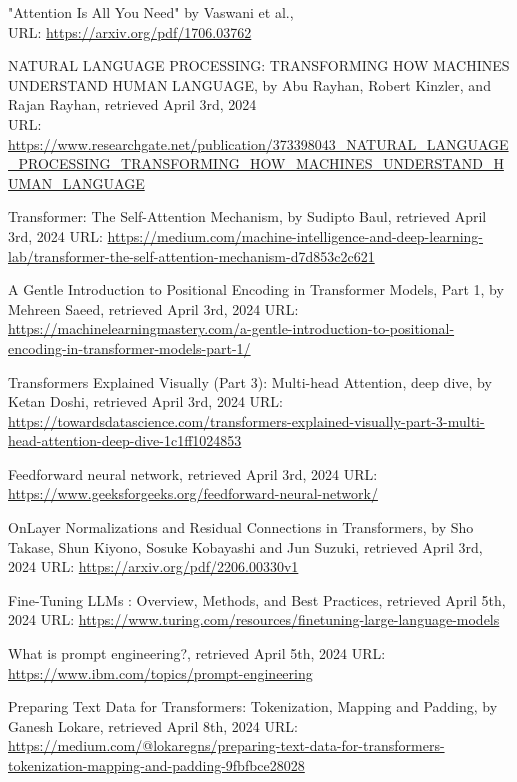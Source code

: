 \begin{thebibliography}{9}
"Attention Is All You Need" by Vaswani et al.,\\ 
URL: \url{https://arxiv.org/pdf/1706.03762}

NATURAL LANGUAGE PROCESSING: TRANSFORMING HOW MACHINES UNDERSTAND HUMAN LANGUAGE, by  Abu Rayhan, Robert Kinzler, and Rajan Rayhan, retrieved April 3rd, 2024 \\
URL: \url{https://www.researchgate.net/publication/373398043_NATURAL_LANGUAGE_PROCESSING_TRANSFORMING_HOW_MACHINES_UNDERSTAND_HUMAN_LANGUAGE}

Transformer: The Self-Attention Mechanism, by Sudipto Baul, retrieved April 3rd, 2024
URL: \url{https://medium.com/machine-intelligence-and-deep-learning-lab/transformer-the-self-attention-mechanism-d7d853c2c621}

A Gentle Introduction to Positional Encoding in Transformer Models, Part 1, by Mehreen Saeed, retrieved April 3rd, 2024
URL: \url{https://machinelearningmastery.com/a-gentle-introduction-to-positional-encoding-in-transformer-models-part-1/}


Transformers Explained Visually (Part 3): Multi-head Attention, deep dive, by Ketan Doshi, retrieved April 3rd, 2024
URL: \url{https://towardsdatascience.com/transformers-explained-visually-part-3-multi-head-attention-deep-dive-1c1ff1024853}

Feedforward neural network, retrieved April 3rd, 2024
URL: \url{https://www.geeksforgeeks.org/feedforward-neural-network/}

OnLayer Normalizations and Residual Connections
 in Transformers, by Sho Takase, Shun Kiyono, Sosuke Kobayashi and Jun Suzuki, retrieved April 3rd, 2024
URL: \url{https://arxiv.org/pdf/2206.00330v1}

Fine-Tuning LLMs : Overview, Methods, and Best Practices, retrieved April 5th, 2024
URL: \url{https://www.turing.com/resources/finetuning-large-language-models}

What is prompt engineering?, retrieved April 5th, 2024
URL: \url{https://www.ibm.com/topics/prompt-engineering}

Preparing Text Data for Transformers: Tokenization, Mapping and Padding, by Ganesh Lokare, retrieved April 8th, 2024
URL: \url{https://medium.com/@lokaregns/preparing-text-data-for-transformers-tokenization-mapping-and-padding-9fbfbce28028}


\end{thebibliography}
